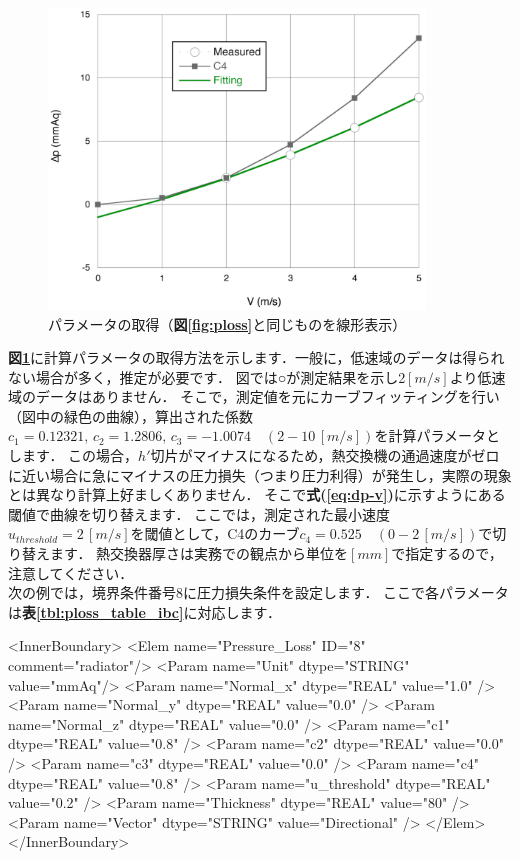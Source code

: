 \begin{figure}[htdp]
\begin{center}
\includegraphics[width=10cm,clip]{rad_para.eps}
\caption{パラメータの取得（\textbf{図\ref{fig:ploss}}と同じものを線形表示）}
\label{fig:get_para}
\end{center}
\end{figure}

\textbf{図\ref{fig:get_para}}に計算パラメータの取得方法を示します．一般に，低速域のデータは得られない場合が多く，推定が必要です．
図では○が測定結果を示し2$[m/s]$より低速域のデータはありません．
そこで，測定値を元にカーブフィッティングを行い（図中の緑色の曲線），算出された係数$c_{1}=0.12321,\,c_{2}=1.2806,\,c_{3}=-1.0074\quad(2-10\,[m/s])$を計算パラメータとします．
この場合，$h'$切片がマイナスになるため，熱交換機の通過速度がゼロに近い場合に急にマイナスの圧力損失（つまり圧力利得）が発生し，実際の現象とは異なり計算上好ましくありません．
そこで\textbf{式(\ref{eq:dp-v})}に示すようにある閾値で曲線を切り替えます．
ここでは，測定された最小速度$u_{threshold}=2\,[m/s]$を閾値として，C4のカーブ$c_{4}=0.525\quad(0-2\,[m/s])$で切り替えます．
熱交換器厚さは実務での観点から単位を$[mm]$で指定するので，注意してください．\\

次の例では，境界条件番号8に圧力損失条件を設定します．
ここで各パラメータは\textbf{表\ref{tbl:ploss_table_ibc}}に対応します．

{\small
\begin{program}
<InnerBoundary>
  <Elem name="Pressure_Loss" ID="8" comment="radiator"/>
    <Param name="Unit"        dtype="STRING" value="mmAq"/>
    <Param name="Normal_x"    dtype="REAL"   value="1.0" />
    <Param name="Normal_y"    dtype="REAL"   value="0.0" />
    <Param name="Normal_z"    dtype="REAL"   value="0.0" />
    <Param name="c1"          dtype="REAL"   value="0.8" />
    <Param name="c2"          dtype="REAL"   value="0.0" />
    <Param name="c3"          dtype="REAL"   value="0.0" />
    <Param name="c4"          dtype="REAL"   value="0.8" />
    <Param name="u_threshold" dtype="REAL"   value="0.2" />
    <Param name="Thickness"   dtype="REAL"   value="80" />
    <Param name="Vector"      dtype="STRING" value="Directional" />
  </Elem>
</InnerBoundary>
\end{program}
}

